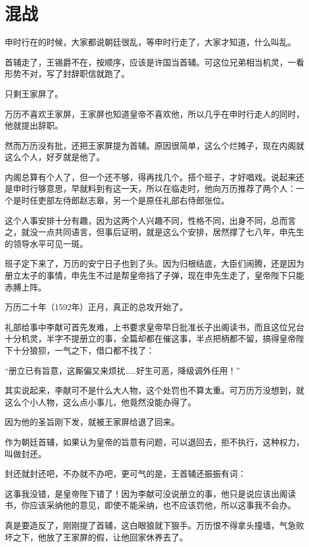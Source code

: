 \section{混战}
\ifnum{}
	\begin{multicols}{\theparacolNo}
\fi
申时行在的时候，大家都说朝廷很乱，等申时行走了，大家才知道，什么叫乱。

首辅走了，王锡爵不在，按顺序，应该是许国当首辅。可这位兄弟相当机灵，一看形势不对，写了封辞职信就跑了。

只剩王家屏了。

万历不喜欢王家屏，王家屏也知道皇帝不喜欢他，所以几乎在申时行走人的同时，他就提出辞职。

然而万历没有批，还把王家屏提为首辅。原因很简单，这么个烂摊子，现在内阁就这么个人，好歹就是他了。

内阁总算有个人了，但一个还不够，得再找几个。搭个班子，才好唱戏。说起来还是申时行够意思，早就料到有这一天，所以在临走时，他向万历推荐了两个人：一个是时任吏部左侍郎赵志皋，另一个是原任礼部右侍郎张位。

这个人事安排十分有趣，因为这两个人兴趣不同，性格不同，出身不同，总而言之，就没一点共同语言，但事后证明，就是这么个安排，居然撑了七八年，申先生的领导水平可见一斑。

班子定下来了，万历的安宁日子也到了头。因为归根结底，大臣们闹腾，还是因为册立太子的事情，申先生不过是帮皇帝挡了子弹，现在申先生走了，皇帝陛下只能赤膊上阵。

万历二十年（1592年）正月，真正的总攻开始了。

礼部给事中李献可首先发难，上书要求皇帝早日批准长子出阁读书，而且这位兄台十分机灵，半字不提册立的事，全篇却都在催这事，半点把柄都不留，搞得皇帝陛下十分狼狈，一气之下，借口都不找了：

“册立已有旨意，这厮偏又来烦扰……好生可恶，降级调外任用！”

其实说起来，李献可不是什么大人物，这个处罚也不算太重。可万历万没想到，就这么个小人物，这么点小事儿，他竟然没能办得了。

因为他的圣旨刚下发，就被王家屏给退了回来。

作为朝廷首辅，如果认为皇帝的旨意有问题，可以退回去，拒不执行，这种权力，叫做封还。

封还就封还吧，不办就不办吧，更可气的是，王首辅还振振有词：

这事我没错，是皇帝陛下错了！因为李献可没说册立的事，他只是说应该出阁读书，你应该采纳他的意见，即使不能采纳，也不应该罚他，所以这事我不会办。

真是要造反了，刚刚提了首辅，这白眼狼就下狠手。万历恨不得拿头撞墙，气急败坏之下，他放了王家屏的假，让他回家休养去了。


\end{multicols}
